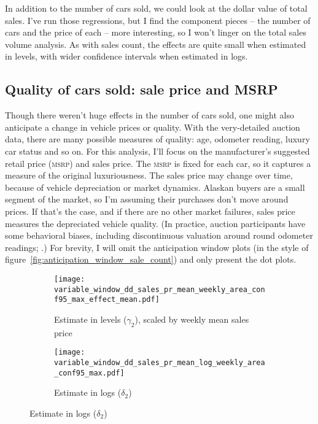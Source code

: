 \documentclass[11pt,letterpaper,oneside]{article}
\newcommand{\msrp}{\textsc{msrp}}
\begin{document}
\begin{doublespacing}
In addition to the number of cars sold, we could look at the dollar value of total sales.
I've run those regressions, but I find the component pieces -- the number of cars and the price of each -- more interesting, so I won't linger on the total sales volume analysis.
As with sales count, the effects are quite small when estimated in levels, with wider confidence intervals when estimated in logs.

\subsection{Quality of cars sold: sale price and MSRP}
Though there weren't huge effects in the number of cars sold, one might also anticipate a change in vehicle prices or quality.
With the very\hyp{}detailed auction data, there are many possible measures of quality: age, odometer reading, luxury car status and so on.
For this analysis, I'll focus on the manufacturer's suggested retail price (\msrp{}) and sales price.
The \msrp{} is fixed for each car, so it captures a measure of the original luxuriousness.
The sales price may change over time, because of vehicle depreciation or market dynamics.
Alaskan buyers are a small segment of the market, so I'm assuming their purchases don't move around prices.
If that's the case, and if there are no other market failures, sales price measures the depreciated vehicle quality.
(In practice, auction participants have some behavioral biases, including discontinuous valuation around round odometer readings; \cite{sallee2016consumers}.)
For brevity, I will omit the anticipation window plots (in the style of figure~\ref{fig:anticipation_window_sale_count}) and only present the dot plots.


\begin{figure}[!hbtp]
    \caption{Sales price effects with varying windows}
    \label{fig:variable_window_sales_price}
    \begin{subfigure}{0.97\linewidth}
        \caption{Estimate in levels ($\gamma_2$), scaled by weekly mean sales price}
        \texttt{[image: variable\_window\_dd\_sales\_pr\_mean\_weekly\_area\_conf95\_max\_effect\_mean.pdf]}
    \end{subfigure}
    \begin{subfigure}{0.97\linewidth}
        \caption{Estimate in logs ($\delta_2$)}
        \texttt{[image: variable\_window\_dd\_sales\_pr\_mean\_log\_weekly\_area\_conf95\_max.pdf]}
    \end{subfigure}


\end{figure}
\end{doublespacing}
\end{document}
